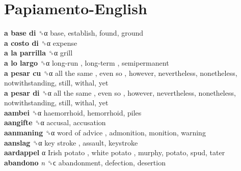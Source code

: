 \twocolumn
\chapter{Papiamento-English}
\small
{}\textbf{a base di} ␝α  base, establish, found, ground  \\
\textbf{a costo di} ␝α  expense  \\
\textbf{a la parrilla} ␝α  grill  \\
\textbf{a lo largo} ␝α   long-run ,  long-term , semipermanent  \\
\textbf{a pesar cu} ␝α   all the same ,  even so , however, nevertheless, nonetheless, notwithstanding, still, withal, yet  \\
\textbf{a pesar di} ␝α   all the same ,  even so , however, nevertheless, nonetheless, notwithstanding, still, withal, yet  \\
\textbf{aambei} ␝α  haemorrhoid, hemorrhoid, piles  \\
\textbf{aangifte} ␝α  accusal, accusation  \\
\textbf{aanmaning} ␝α   word of advice , admonition, monition, warning  \\
\textbf{aanslag} ␝α   key stroke , assault, keystroke  \\
\textbf{aardappel} α   Irish potato ,  white potato , murphy, potato, spud, tater  \\
\textbf{abandono} \emph{n}  ␝ϲ  abandonment, defection, desertion  \\
